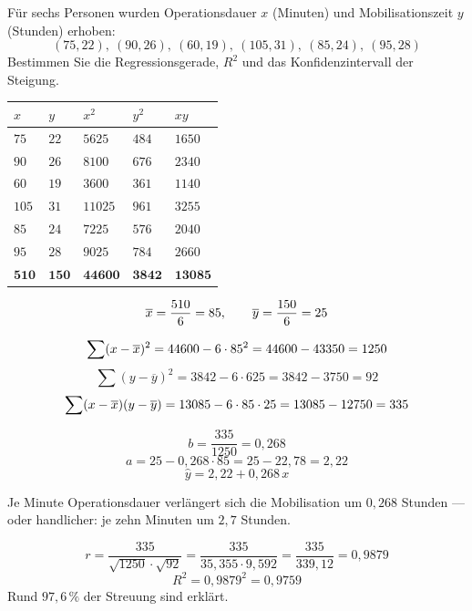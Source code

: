 \begin{aufgabe}
Für sechs Personen wurden Operationsdauer $x$ (Minuten) und Mobilisationszeit $y$ (Stunden) erhoben:
\[ (75, 22),\ (90, 26),\ (60, 19),\ (105, 31),\ (85, 24),\ (95, 28) \]
Bestimmen Sie die Regressionsgerade, $R^2$ und das Konfidenzintervall der Steigung.

\loesung
{}
\begin{center}
{\small
\renewcommand{\arraystretch}{1.3}
\begin{tabular}{@{}P{1.2cm}P{1.2cm}P{1.6cm}P{1.4cm}P{1.6cm}@{}}
\toprule
$x$ & $y$ & $x^2$ & $y^2$ & $xy$\\
\midrule
$75$ & $22$ & $5625$ & $484$ & $1650$\\
$90$ & $26$ & $8100$ & $676$ & $2340$\\
$60$ & $19$ & $3600$ & $361$ & $1140$\\
$105$ & $31$ & $11025$ & $961$ & $3255$\\
$85$ & $24$ & $7225$ & $576$ & $2040$\\
$95$ & $28$ & $9025$ & $784$ & $2660$\\
\midrule
$\mathbf{510}$ & $\mathbf{150}$ & $\mathbf{44600}$ & $\mathbf{3842}$ & $\mathbf{13085}$\\
\bottomrule
\end{tabular}}
\end{center}

\[ \overline{x} = \frac{510}{6} = 85, \qquad \overline y = \frac{150}{6} = 25 \]

\[ \sum(x-\overline{x})^2 = 44600 - 6 \cdot 85^2 = 44600 - 43350 = 1250 \]
\[ \sum(y-\overline y)^2 = 3842 - 6 \cdot 625 = 3842 - 3750 = 92 \]
\[ \sum(x-\overline{x})(y-\overline y) = 13085 - 6 \cdot 85 \cdot 25 = 13085 - 12750 = 335 \]

\[ b = \frac{335}{1250} = 0{,}268 \]
\[ a = 25 - 0{,}268 \cdot 85 = 25 - 22{,}78 = 2{,}22 \]
\[ \hat y = 2{,}22 + 0{,}268\,x \]

Je Minute Operationsdauer verlängert sich die Mobilisation um $0{,}268$ Stunden --- oder handlicher: je zehn Minuten um $2{,}7$ Stunden.

\[ r = \frac{335}{\sqrt{1250}\cdot\sqrt{92}} = \frac{335}{35{,}355 \cdot 9{,}592} = \frac{335}{339{,}12} = 0{,}9879 \]
\[ R^2 = 0{,}9879^2 = 0{,}9759 \]
Rund $97{,}6\,\%$ der Streuung sind erklärt.


\end{aufgabe}
